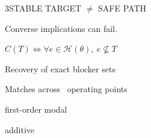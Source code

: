 {\begin{minipage}[t][\PosterTopRowHeight][t]{\PosterThreeWidth}
\begin{TicketTwoPanel}{\PosterTopRowHeight}{3}{STABLE TARGET $\ne$ SAFE PATH}
    {\TableSize\color{IASVermillion}Converse implications can fail.\par}
    \vspace{1mm}
    \colorbox{IASPaleGreen}{\parbox[c][24mm][c]{\dimexpr\linewidth-2\fboxsep\relax}{\centering
      {\PosterEquationShortType$C(T)\iff\forall e\in\mathcal H(\theta),\ e\nsubseteq T$}}}\par
    \vspace{2mm}
    {\PosterCompactHeadingType\color{IASDarkGreen}Recovery of exact blocker sets\par}
    {\FigureSize\color{IASDarkText}Matches across \BaselineTotal\ operating points\par}
    \vspace{1mm}
    \noindent\begin{minipage}[c][17mm][c]{66mm}{\FigureSize first-order modal}\end{minipage}\hspace{1mm}%
      \begin{minipage}[c][17mm][c]{85mm}\centering
      \end{minipage}\hspace{1mm}%
      \begin{minipage}[c][17mm][c]{41mm}\centering{\TableSize\bfseries\color{IASBlue}\BaselineModalExactCount/\BaselineTotal}\end{minipage}\par
    \noindent\begin{minipage}[c][17mm][c]{66mm}{\FigureSize additive}\end{minipage}\hspace{1mm}%
      \begin{minipage}[c][17mm][c]{85mm}\centering
      \end{minipage}\hspace{1mm}%
      \begin{minipage}[c][17mm][c]{41mm}\centering{\TableSize\bfseries\color{IASBlue}\BaselineAdditiveExactCount/\BaselineTotal}\end{minipage}\par

\end{TicketTwoPanel}
\end{minipage}}
